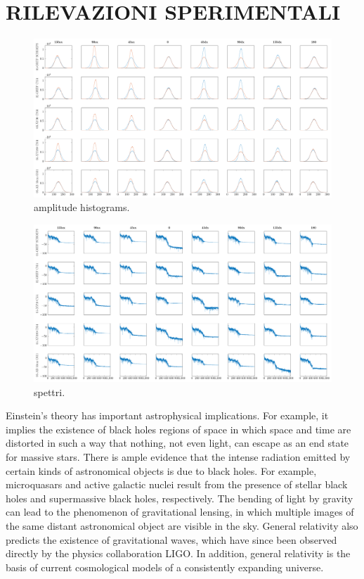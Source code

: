 \clearpage
\section*{RILEVAZIONI SPERIMENTALI}

%

\begin{figure}[t]
\centering
\includegraphics[width=.97\textwidth]{img/statistiche/pdf/amplitude_histograms}
\caption{amplitude histograms.}
\label{amphist}
\end{figure}

\begin{figure}[t]
\centering
\includegraphics[width=.97\textwidth]{img/statistiche/pdf/spectra}
\caption{spettri.}
\label{spettri}
\end{figure}

Einstein's theory has important astrophysical implications. For example, it
implies the existence of black holes regions of space in which space and time
are distorted in such a way that nothing, not even light, can escape as an
end state for massive stars. There is ample evidence that the intense radiation
emitted by certain kinds of astronomical objects is due to black holes. For
example, microquasars and active galactic nuclei result from the presence of
stellar black holes and supermassive black holes, respectively. The bending of
light by gravity can lead to the phenomenon of gravitational lensing, in which
multiple images of the same distant astronomical object are visible in the sky.
General relativity also predicts the existence of gravitational waves, which
have since been observed directly by the physics collaboration LIGO. In addition,
general relativity is the basis of current cosmological models of a consistently
expanding universe.

